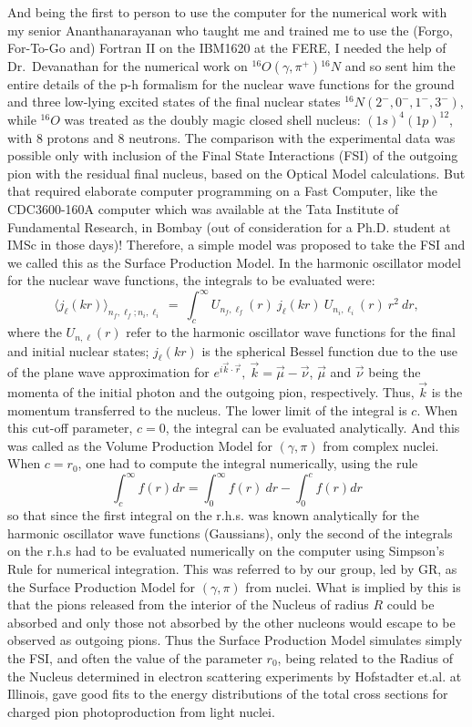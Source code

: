 And being the first to person to use the computer for the numerical work with my senior Ananthanarayanan who taught me and trained me to use the (Forgo, For-To-Go and) Fortran II on the IBM1620 at the FERE, I needed the help of Dr.\ Devanathan for the numerical work on ${}^{16}O(\gamma, \pi^+){}^{16}N$ and so sent him the entire details of the p-h formalism for the nuclear wave functions for the ground and three low-lying excited states of the final nuclear states $^{16}N(2^-,0^-,1^-,3^-)$, while $^{16}O$ was treated as the doubly magic closed shell nucleus: $(1s)^4(1p)^{12}$, with 8 protons and 8 neutrons. The comparison with the experimental data was possible only with inclusion of the Final State Interactions (FSI) of the outgoing pion with the residual final nucleus, based on the Optical Model calculations. But that required elaborate computer programming on a Fast Computer, like the CDC3600-160A computer which was available at the Tata Institute of Fundamental Research, in Bombay (out of consideration for a Ph.D. student at IMSc in those days)! Therefore, a simple model was proposed to take the FSI and we called this as the Surface Production Model. In the harmonic oscillator model for the nuclear wave functions, the integrals to be evaluated were:
$$
\langle j_\ell(kr)\rangle_{n_f,\ell_f;n_i,\ell_i}\ =\  \int_c^\infty U_{n_f,\ell_f}(r)
\ j_{\ell}(kr)\ U_{n_i,\ell_i}(r)\ r^2\ dr,
$$
where the $U_{n,\ell}(r)$ refer to the harmonic oscillator wave functions for the final and initial nuclear states; $j_\ell(kr)$ is the spherical Bessel function due to the use of the plane wave approximation for $e^{i\vec{k}\cdot \vec{r}},\  \vec{k}=\vec{\mu}-\vec{\nu}$, $\vec{\mu}$ and $\vec{\nu}$ being the momenta of the initial photon and the outgoing pion, respectively. Thus, $\vec{k}$ is the momentum transferred to the nucleus. The lower limit of the integral is $c$. When this cut-off parameter, $c=0$, the integral can be evaluated analytically. And this was called as the Volume Production Model for $(\gamma,\pi)$ from complex nuclei. When $c=r_0$, one had to compute the integral numerically, using the rule
$$
\int_c^\infty f(r) dr = \int_0^\infty f(r)\ dr - \int_0^c f(r) dr
$$
so that since the first integral on the r.h.s. was known analytically for the harmonic oscillator wave functions (Gaussians), only the second of the integrals on the r.h.s had to be evaluated numerically on the computer using Simpson's Rule for numerical integration. This was referred to by our group, led by GR, as the Surface Production Model for $(\gamma,\pi)$ from nuclei. What is implied by this is that the pions released from the interior of the Nucleus of radius $R$ could be absorbed and only those not absorbed by the other nucleons would escape to be observed as outgoing pions. Thus the Surface Production Model simulates simply the FSI, and often the value of the parameter $r_0$, being related to the Radius of the Nucleus determined in electron scattering experiments by Hofstadter et.al. at Illinois, gave good fits to the energy distributions of the total cross sections for charged pion photoproduction from light nuclei.

